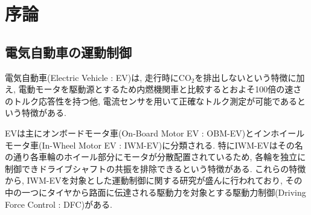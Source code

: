 \documentclass[11pt,a4paper,oneside,onecolumn,fleqn,dvipdfmx]{jsarticle}
\begin{document}
\thispagestyle{empty}
\begin{center}
    \vspace*{20pt}
    {\fontsize{50pt}{0pt}\selectfont{卒業論文中間報告書}}
    \vskip 60pt
    {\fontsize{32pt}{0pt}\selectfont{EVの駆動力制御のための\\[5pt]機械学習を用いた\\[5pt]路面$\mu -\lambda$曲線推定を伴う\\[5pt]最適スリップ率推定}}
    \vskip 60pt
    {\fontsize{32pt}{0pt}\selectfont{2026年10月02日 \ 提出}}
    \vskip 60pt
    {\fontsize{32pt}{0pt}\selectfont{指導教員}}
    \vskip 20pt
    {\fontsize{32pt}{0pt}\selectfont{藤本 博志 教授}}
    \vskip 60pt
    {\fontsize{32pt}{0pt}\selectfont{電気電子工学科}}
    \vskip 20pt
    {\fontsize{32pt}{0pt}\selectfont{03-250513\ \ 堀越太智}}
\end{center}
\clearpage



\tableofcontents

\listoffigures

\listoftables
\clearpage


\setcounter{page}{1}


\section{序論}
\subsection{電気自動車の運動制御}
電気自動車(Electric Vehicle : EV)は, 走行時にCO$_2$を排出しないという特徴に加え, 電動モータを駆動源とするため内燃機関車と比較するとおよそ100倍の速さのトルク応答性を持つ他, 電流センサを用いて正確なトルク測定が可能であるという特徴がある\cite{yoshimura}. 

EVは主にオンボードモータ車(On-Board Motor EV : OBM-EV)とインホイールモータ車(In-Wheel Motor EV : IWM-EV)に分類される. 
特にIWM-EVはその名の通り各車輪のホイール部分にモータが分散配置されているため, 各輪を独立に制御できドライブシャフトの共振を排除できるという特徴がある. 
これらの特徴から, IWM-EVを対象とした運動制御に関する研究が盛んに行われており, その中の一つにタイヤから路面に伝達される駆動力を対象とする駆動力制御(Driving Force Control : DFC)がある\cite{binhminh}. 
\end{document}
